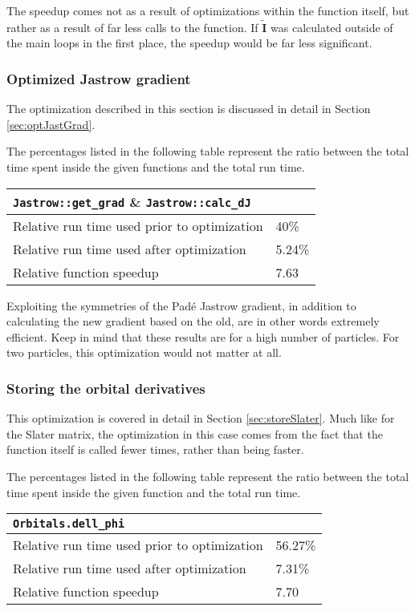 The speedup comes not as a result of optimizations within the function itself, but rather as a result of far less calls to the function. If $\mathbf{\tilde I}$ was calculated outside of the main loops in the first place, the speedup would be far less significant. 


\subsubsection{Optimized Jastrow gradient}

The optimization described in this section is discussed in detail in Section \ref{sec:optJastGrad}.

The percentages listed in the following table represent the ratio between the total time spent inside the given functions and the total run time. 

\begin{tabular}{ll}
 \verb+Jastrow::get_grad+ \& \verb+Jastrow::calc_dJ+ & \\
 \hline\hline
 Relative run time used prior to optimization & 40\% \\
 Relative run time used after optimization    & 5.24\% \\
 \hline
 Relative function speedup                   & 7.63
\end{tabular}

Exploiting the symmetries of the Padé Jastrow gradient, in addition to calculating the new gradient based on the old, are in other words extremely efficient. Keep in mind that these results are for a high number of particles. For two particles, this optimization would not matter at all.

\subsubsection{Storing the orbital derivatives}

This optimization is covered in detail in Section \ref{sec:storeSlater}. Much like for the Slater matrix, the optimization in this case comes from the fact that the function itself is called fewer times, rather than being faster.

The percentages listed in the following table represent the ratio between the total time spent inside the given function and the total run time. 


\begin{tabular}{ll}
 \verb+Orbitals.dell_phi+ & \\
 \hline\hline
 Relative run time used prior to optimization & 56.27\% \\
 Relative run time used after optimization    & 7.31\% \\
 \hline
 Relative function speedup                   & 7.70
\end{tabular}


